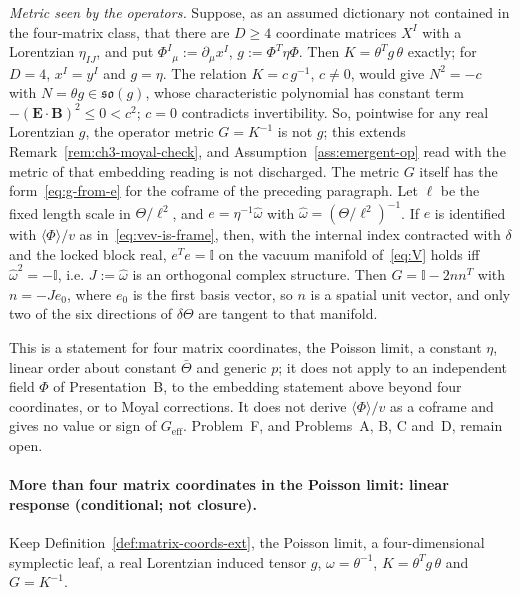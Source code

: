 \emph{Metric seen by the operators.} Suppose, as an assumed dictionary not contained in the four-matrix class, that there are \(D\ge4\) coordinate matrices \(X^I\) with a Lorentzian \(\eta_{IJ}\), and put \(\Phi^I{}_\mu:=\partial_\mu x^I\), \(g:=\Phi^T\eta\Phi\). Then \(K=\theta^{T}g\,\theta\) exactly; for \(D=4\), \(x^I=y^I\) and \(g=\eta\). The relation \(K=c\,g^{-1}\), \(c\neq0\), would give \(N^2=-c\) with \(N=\theta g\in\mathfrak{so}(g)\), whose characteristic polynomial has constant term \(-(\mathbf E\cdot\mathbf B)^2\le0<c^2\); \(c=0\) contradicts invertibility. So, pointwise for any real Lorentzian \(g\), the operator metric \(G=K^{-1}\) is not \(g\); this extends Remark~\ref{rem:ch3-moyal-check}, and Assumption~\ref{ass:emergent-op} read with the metric of that embedding reading is not discharged. The metric \(G\) itself has the form~\eqref{eq:g-from-e} for the coframe of the preceding paragraph. Let \(\ell\) be the fixed length scale in \(\Theta/\ell^2\), and \(e=\eta^{-1}\hat\omega\) with \(\hat\omega=(\Theta/\ell^2)^{-1}\). If \(e\) is identified with \(\langle\Phi\rangle/v\) as in~\eqref{eq:vev-is-frame}, then, with the internal index contracted with \(\delta\) and the locked block real, \(e^Te=\mathbb I\) on the vacuum manifold of~\eqref{eq:V} holds iff \(\hat\omega^2=-\mathbb I\), i.e. \(J:=\hat\omega\) is an orthogonal complex structure. Then \(G=\mathbb I-2nn^T\) with \(n=-Je_0\), where \(e_0\) is the first basis vector, so \(n\) is a spatial unit vector, and only two of the six directions of \(\delta\Theta\) are tangent to that manifold.

This is a statement for four matrix coordinates, the Poisson limit, a constant \(\eta\), linear order about constant \(\bar\Theta\) and generic \(p\); it does not apply to an independent field \(\Phi\) of Presentation~B, to the embedding statement above beyond four coordinates, or to Moyal corrections. It does not derive \(\langle\Phi\rangle/v\) as a coframe and gives no value or sign of \(G_{\mathrm{eff}}\). Problem~F, and Problems~A, B, C and~D, remain open.

\paragraph{More than four matrix coordinates in the Poisson limit: linear response (conditional; not closure).}
Keep Definition~\ref{def:matrix-coords-ext}, the Poisson limit, a four-dimensional symplectic leaf, a real Lorentzian induced tensor \(g\), \(\omega=\theta^{-1}\), \(K=\theta^{T}g\,\theta\) and \(G=K^{-1}\).

